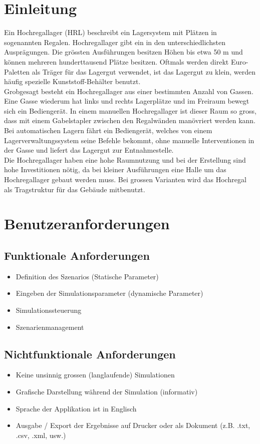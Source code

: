 \documentclass[11pt,a4paper]{article}
\begin{document}
\section{Einleitung}
Ein Hochregallager (HRL) beschreibt ein Lagersystem mit Plätzen in sogenannten Regalen. Hochregallager gibt ein in den unterschiedlichsten Ausprägungen. Die grössten Ausführungen besitzen Höhen bis etwa 50 m und können mehreren hunderttausend Plätze besitzen. Oftmals werden direkt Euro-Paletten als Träger für das Lagergut verwendet, ist das Lagergut zu klein, werden häufig spezielle Kunststoff-Behälter benutzt.\\
Grobgesagt besteht ein Hochregallager aus einer bestimmten Anzahl von Gassen. Eine Gasse wiederum hat links und rechts Lagerplätze und im Freiraum bewegt sich ein Bediengerät. In einem manuellen Hochregallager ist dieser Raum so gross, dass mit einem Gabelstapler zwischen den Regalwänden manövriert werden kann. Bei automatischen Lagern fährt ein Bediengerät, welches von einem Lagerverwaltungssystem seine Befehle bekommt, ohne manuelle Interventionen in der Gasse und liefert das Lagergut zur Entnahmestelle.\\
Die Hochregallager haben eine hohe Raumnutzung und bei der Erstellung sind hohe Investitionen nötig, da bei kleiner Ausführungen eine Halle um das Hochregallager gebaut werden muss. Bei grossen Varianten wird das Hochregal als Tragstruktur für das Gebäude mitbenutzt. 
%
\section{Benutzeranforderungen}
%
\subsection{Funktionale Anforderungen}
\begin{itemize}
  \item Definition des Szenarios (Statische Parameter)
  \item Eingeben der Simulationsparameter (dynamische Parameter)
  \item Simulationssteuerung
  \item Szenarienmanagement
\end{itemize}
%
\subsection{Nichtfunktionale Anforderungen}
\begin{itemize}
  \item Keine unsinnig grossen (langlaufende) Simulationen
  \item Grafische Darstellung während der Simulation (informativ)
  \item Sprache der Applikation ist in Englisch
  \item Ausgabe / Export der Ergebnisse auf Drucker oder als Dokument (z.B. .txt, .csv, .xml, usw.)
\end{itemize}
\end{document}

